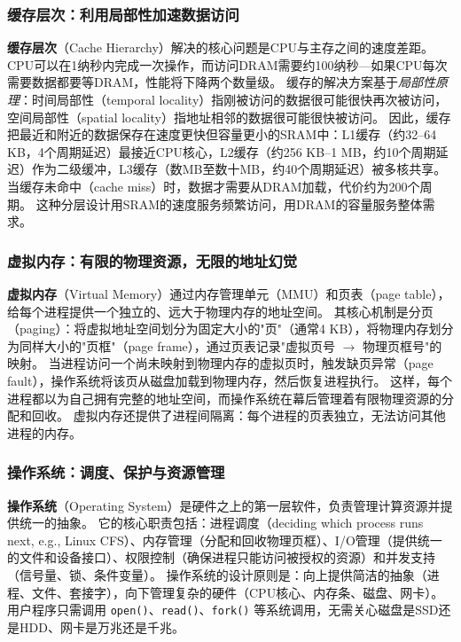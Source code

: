 \subsubsection{缓存层次：利用局部性加速数据访问}

\textbf{缓存层次}（Cache Hierarchy）解决的核心问题是CPU与主存之间的速度差距。
CPU可以在1纳秒内完成一次操作，而访问DRAM需要约100纳秒---如果CPU每次需要数据都要等DRAM，性能将下降两个数量级。
缓存的解决方案基于\emph{局部性原理}：时间局部性（temporal locality）指刚被访问的数据很可能很快再次被访问，空间局部性（spatial locality）指地址相邻的数据很可能很快被访问\cite{drepper2007memory}。
因此，缓存把最近和附近的数据保存在速度更快但容量更小的SRAM中：L1缓存（约32--64 KB，4个周期延迟）最接近CPU核心，L2缓存（约256 KB--1 MB，约10个周期延迟）作为二级缓冲，L3缓存（数MB至数十MB，约40个周期延迟）被多核共享。
当缓存未命中（cache miss）时，数据才需要从DRAM加载，代价约为200个周期。
这种分层设计用SRAM的速度服务频繁访问，用DRAM的容量服务整体需求。

\subsubsection{虚拟内存：有限的物理资源，无限的地址幻觉}

\textbf{虚拟内存}（Virtual Memory）通过内存管理单元（MMU）和页表（page table），给每个进程提供一个独立的、远大于物理内存的地址空间。
其核心机制是分页（paging）：将虚拟地址空间划分为固定大小的"页"（通常4 KB），将物理内存划分为同样大小的"页框"（page frame），通过页表记录"虚拟页号 $\to$ 物理页框号"的映射。
当进程访问一个尚未映射到物理内存的虚拟页时，触发缺页异常（page fault），操作系统将该页从磁盘加载到物理内存，然后恢复进程执行\cite{ostep_2023}。
这样，每个进程都以为自己拥有完整的地址空间，而操作系统在幕后管理着有限物理资源的分配和回收。
虚拟内存还提供了进程间隔离：每个进程的页表独立，无法访问其他进程的内存。

\subsubsection{操作系统：调度、保护与资源管理}

\textbf{操作系统}（Operating System）是硬件之上的第一层软件，负责管理计算资源并提供统一的抽象。
它的核心职责包括：进程调度（deciding which process runs next, e.g., Linux CFS\cite{linux_cfs_2026}）、内存管理（分配和回收物理页框）、I/O管理（提供统一的文件和设备接口）、权限控制（确保进程只能访问被授权的资源）和并发支持（信号量、锁、条件变量）\cite{ostep_2023,xv6_2022}。
操作系统的设计原则是：向上提供简洁的抽象（进程、文件、套接字），向下管理复杂的硬件（CPU核心、内存条、磁盘、网卡）。
用户程序只需调用 \texttt{open()}、\texttt{read()}、\texttt{fork()} 等系统调用，无需关心磁盘是SSD还是HDD、网卡是万兆还是千兆。

